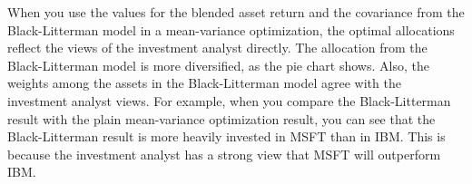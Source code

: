 When you use the values for the blended asset return and the covariance from the Black-Litterman model in a mean-variance optimization, the optimal allocations reflect the views of the investment analyst directly. The allocation from the Black-Litterman model is more diversified, as the pie chart shows. Also, the weights among the assets in the Black-Litterman model agree with the investment analyst views. For example, when you compare the Black-Litterman result with the plain mean-variance optimization result, you can see that the Black-Litterman result is more heavily invested in MSFT than in IBM. This is because the investment analyst has a strong view that MSFT will outperform IBM.
%
%
%
%
%
%
%
%
%
